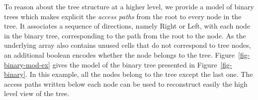 \documentclass{llncs}
\begin{document}




To reason about the tree structure at a higher level, we provide a model of binary trees
which makes explicit the
\emph{access paths} from the root to every node in the tree.
It associates a sequence of
directions, namely Right or Left, with each node in the binary tree,
corresponding to the path from the root to the node. As the underlying array
also contains unused cells that do not correspond to tree nodes, an additional
boolean encodes whether the node belongs to the
tree. Figure~\ref{fig-binary-mod-ex} gives the model of the binary tree
presented in Figure~\ref{fig-binary}. In this example, all the nodes belong to
the tree except the last one. The access paths written below each node can be used to
reconstruct easily the high level view of the tree.

\end{document}
